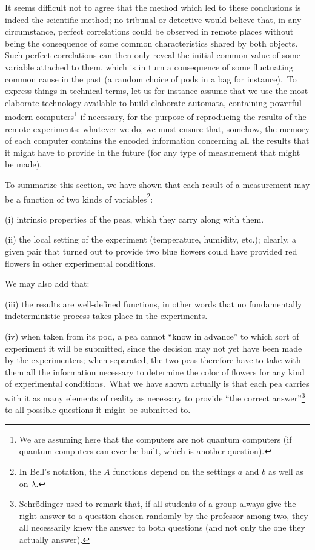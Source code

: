 \documentclass[12pt,onecolumn]{article}%
\begin{document}
It seems difficult not to agree that the method which led to these conclusions
is indeed the scientific method; no tribunal or detective would believe that,
in any circumstance, perfect correlations could be observed in remote places
without being the consequence of some common characteristics shared by both
objects. Such perfect correlations can then only reveal the initial common
value of some variable attached to them, which is in turn a consequence of
some fluctuating common cause in the past (a random choice of pods in a bag
for instance).\ To express things in technical terms, let us for instance
assume that we use the most elaborate technology available to build elaborate
automata, containing powerful modern computers\footnote{We are assuming here
that the computers are not quantum computers (if quantum computers can ever be
built, which is another question).} if necessary, for the purpose of
reproducing the results of the remote experiments: whatever we do, we must
ensure that, somehow, the memory of each computer contains the encoded
information concerning all the results that it might have to provide in the
future (for any type of measurement that might be made).

To summarize this section, we have shown that each result of a measurement may
be a function of two kinds of variables\footnote{In Bell's notation, the $A$
functions\ depend on the settings $a$ and $b$ as well as on $\lambda$.}:

(i) intrinsic properties of the peas, which they carry along with them.

(ii) the local setting of the experiment (temperature, humidity, etc.);
clearly, a given pair that turned out to provide two blue flowers could have
provided red flowers in other experimental conditions.

We may also add that:

(iii) the results are well-defined functions, in other words that no
fundamentally indeterministic process takes place in the experiments.

(iv) when taken from its pod, a pea cannot ``know in advance'' to which sort
of experiment it will be submitted, since the decision may not yet have been
made by the experimenters; when separated, the two peas therefore have to take
with them all the information necessary to determine the color of flowers for
any kind of experimental conditions.\ What we have shown actually is that each
pea carries with it as many elements of reality as necessary to provide ``the
correct answer''\footnote{Schr\"{o}dinger used to remark that, if all students
of a group always give the right answer to a question chosen randomly by the
professor among two, they all necessarily knew the answer to both questions
(and not only the one they actually answer).} to all possible questions it
might be submitted to.
\end{document}
